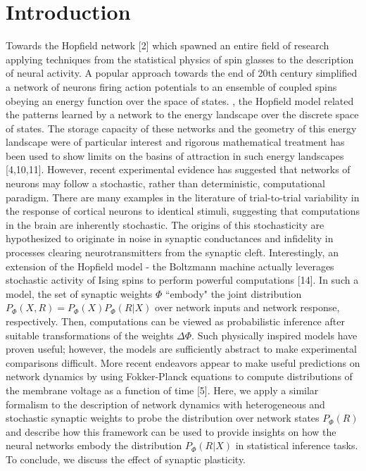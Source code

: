 \documentclass{ucetd}
\begin{document}
\mainmatter

\chapter{Introduction}

Towards the Hopfield network [2] which spawned an entire field of research applying techniques from the statistical physics of spin glasses to the description of neural activity. A popular approach towards the end of 20th century simplified a network of neurons firing action potentials to an ensemble of coupled spins obeying an energy function over the space of states. , the Hopfield model related the patterns learned by a network to the energy landscape over the discrete space of states. The storage capacity of these networks and the geometry of this energy landscape were of particular interest and rigorous mathematical treatment has been used to show limits on the basins of attraction in such energy landscapes [4,10,11]. However, recent experimental evidence has suggested that networks of neurons may follow a stochastic, rather than deterministic, computational paradigm. There are many examples in the literature of trial-to-trial variability in the response of cortical neurons to identical stimuli, suggesting that computations in the brain are inherently stochastic. The origins of this stochasticity are hypothesized to originate in noise in synaptic conductances and infidelity in processes clearing neurotransmitters from the synaptic cleft. Interestingly, an extension of the Hopfield model - the Boltzmann machine actually leverages stochastic activity of Ising spins to perform powerful computations [14]. In such a model, the set of synaptic weights $\Phi$ ``embody" the joint distribution $P_{\Phi}(X,R) = P_{\Phi}(X)P_{\Phi}(R|X)$ over network inputs and network response, respectively. Then, computations can be viewed as probabilistic inference after suitable transformations of the weights $\Delta\Phi$. Such physically inspired models have proven useful; however, the models are sufficiently abstract to make experimental comparisons difficult. More recent endeavors appear to make useful predictions on network dynamics by using Fokker-Planck equations to compute distributions of the membrane voltage as a function of time [5]. Here, we apply a similar formalism to the description of network dynamics with heterogeneous and stochastic synaptic weights to probe the distribution over network states $P_{\Phi}(R)$ and describe how this framework can be used to provide insights on how the neural networks embody the distribution $P_{\Phi}(R|X)$ in statistical inference tasks. To conclude, we discuss the effect of synaptic plasticity.
\end{document}
